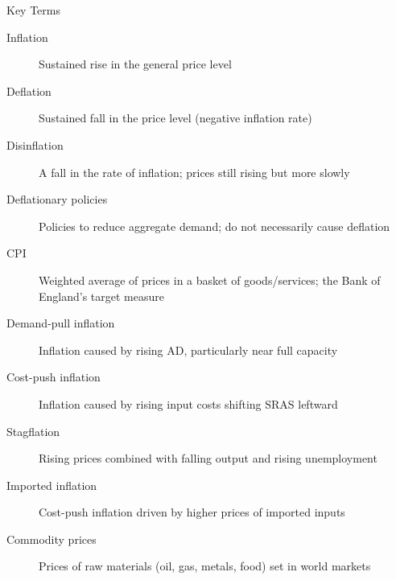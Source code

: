 \documentclass[16pt,aspectratio=169]{beamer}
\begin{document}
\begin{frame}[allowframebreaks]{Key Terms}
    \begin{description}
        \item[Inflation] Sustained rise in the general price level
        \item[Deflation] Sustained fall in the price level (negative inflation rate)
        \item[Disinflation] A fall in the rate of inflation; prices still rising but more slowly
        \item[Deflationary policies] Policies to reduce aggregate demand; do not necessarily cause deflation
        \item[CPI] Weighted average of prices in a basket of goods/services; the Bank of England's target measure
        \item[Demand-pull inflation] Inflation caused by rising AD, particularly near full capacity
        \item[Cost-push inflation] Inflation caused by rising input costs shifting SRAS leftward
        \item[Stagflation] Rising prices combined with falling output and rising unemployment
        \item[Imported inflation] Cost-push inflation driven by higher prices of imported inputs
        \item[Commodity prices] Prices of raw materials (oil, gas, metals, food) set in world markets
    \end{description}
\end{frame}
\end{document}
